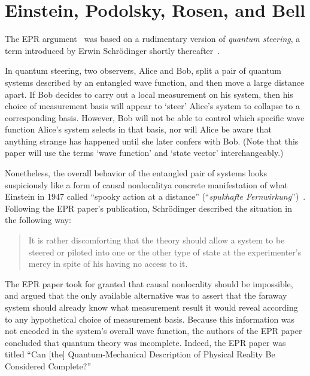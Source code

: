 \documentclass[twoside,twocolumn,english,prl,superscriptaddress,nobibnotes,nofootinbib]{revtex4-2}
\begin{document}
\section{Einstein, Podolsky, Rosen, and Bell\label{sec:Einstein-Podolsky-Rosen-and-Bell}}

The EPR argument~\citep{EinsteinPodolskyRosen:1935cqmdprbcc} was
based on a rudimentary version of \emph{quantum steering}, a term
introduced by Erwin Schr{\"o}dinger shortly thereafter~\citep{Schrodinger:1935dprbss,Schrodinger:1936prbss}. 

In quantum steering, two observers, Alice and Bob, split a pair of
quantum systems described by an entangled wave function, and then
move a large distance apart. If Bob decides to carry out a local measurement
on his system, then his choice of measurement basis will appear to
\textquoteleft steer\textquoteright{} Alice's system to collapse to
a corresponding basis. However, Bob will not be able to control which
specific wave function Alice's system selects in that basis, nor will
Alice be aware that anything strange has happened until she later
confers with Bob. (Note that this paper will use the terms \textquoteleft wave
function\textquoteright{} and \textquoteleft state vector\textquoteright{}
interchangeably.) 

Nonetheless, the overall behavior of the entangled pair of systems
looks suspiciously like a form of causal nonlocality\textemdash a
concrete manifestation of what Einstein in 1947 called ``spooky action
at a distance'' (``\emph{spukhafte Fernwirkung}'')~\citep{Einstein:1947ltmb}.
Following the EPR paper's publication, Schr{\"o}dinger described the situation
in the following way: 
\begin{quotation}
It is rather discomforting that the theory should allow a system to
be steered or piloted into one or the other type of state at the experimenter's
mercy in spite of his having no access to it.~\citep{Schrodinger:1935dprbss}
\end{quotation}

The EPR paper took for granted that causal nonlocality should be impossible,
and argued that the only available alternative was to assert that
the faraway system should already know what measurement result it
would reveal according to any hypothetical choice of measurement basis.
Because this information was not encoded in the system's overall wave
function, the authors of the EPR paper concluded that quantum theory
was incomplete. Indeed, the EPR paper was titled ``Can {[}the{]}
Quantum-Mechanical Description of Physical Reality Be Considered Complete?''
\end{document}
